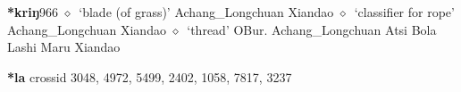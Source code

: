   \begin{list}{}{\leftmargin=1.5em \itemindent=-1.5em}
  \item {\footnotesize \textbf{*kriŋ}}{\tiny 966}
         $\diamond$~`blade (of grass)'
         Achang\_Longchuan 
\hspace{1ex}
         Xiandao 
\hspace{1ex}
         $\diamond$~`classifier for rope'
         Achang\_Longchuan 
\hspace{1ex}
         Xiandao 
\hspace{1ex}
         $\diamond$~`thread'
         OBur. 
\hspace{1ex}
         Achang\_Longchuan 
\hspace{1ex}
         Atsi 
\hspace{1ex}
         Bola 
\hspace{1ex}
         Lashi 
\hspace{1ex}
         Maru 
\hspace{1ex}
         Xiandao 
  \end{list}
\item
\textbf{*la}
  {\tiny crossid 3048, 4972, 5499, 2402, 1058, 7817, 3237}

